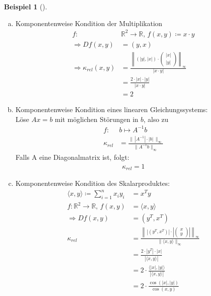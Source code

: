 \documentclass[ngerman,fontsize=11pt, paper=a4, parskip=half, titlepage=true, toc=bib]{scrbook}
\theoremstyle{definition}
\newtheorem{Bsp}[Def]{Beispiel}
\theoremstyle{plain}
\newcommand{\R}{\mathds{R}}
\newcommand{\subsectione}[1]{\subsection{#1} \addtocounter{Def}{1}}
\newenvironment{Bspe}[1][]{ %
	\begin{Bsp}[#1]
	}
	{
	\end{Bsp}
	\addtocounter{subsection}{1}
}
\begin{document}
\begin{Bspe}~
	\begin{enumerate}[a)]
		\item Komponentenweise Kondition der Multiplikation
		\begin{align*}
		f:&\R^2 \rightarrow \R, \, f(x,y) \coloneqq x\cdot y \\
		\Rightarrow Df(x,y) &= (y, x)  \\
		\Rightarrow \kappa_{rel}(x,y) &= \frac{\left\| (|y|, |x|)\cdot \begin{pmatrix}
			|x| \\
			|y|
			\end{pmatrix}\right\|_\infty}
			{|x\cdot y|} \\
			&= \frac{2\cdot|x|\cdot |y|}{|x\cdot y|} \\
			&= 2
			\end{align*}
			\item Komponentenweise Kondition eines linearen Gleichungssystems:\\
			Löse $Ax=b$ mit möglichen Störungen in $b$, also zu
			\begin{align*}
			f: & b\mapsto A^{-1}b \\
			\kappa_{rel} & = \frac{\| \, |A^{-1}| \cdot |b|\, \|_\infty}{\|A^{-1}b\|_\infty}
			\end{align*}
			Falls A eine Diagonalmatrix ist, folgt:
			\begin{gather*}
			\kappa_{rel}=1
			\end{gather*}
			\item Komponentenweise Kondition des Skalarproduktes:
			\begin{align*}
			\langle x,y \rangle \coloneqq \sum_{i=1}^{n}x_i y_i& = x^Ty \\
			f: \R^2 \rightarrow \R, \, f(x,y) &= \langle x,y \rangle \\
			\Rightarrow Df(x,y) &= (y^T, x^T) \\
			\kappa_{rel}  &= \frac{\left\| \,\left|(y^T, x^T)\right|\cdot\left|\begin{pmatrix}
				x \\
				y
				\end{pmatrix}\right|\right\|_\infty }
				{\|\langle x,y\rangle\|_\infty}\\
				&= \frac{2\cdot |y^T|\cdot |x|}{|\langle x,y\rangle|} \\
				&= 2\cdot \frac{\langle |x|,|y|\rangle}{|\langle x,y\rangle|} \\
				&= 2 \cdot \frac{\cos(|x|, |y|)}{\cos(x,y)}  \\

\end{align*}
\end{enumerate}
\end{Bspe}
\end{document}
